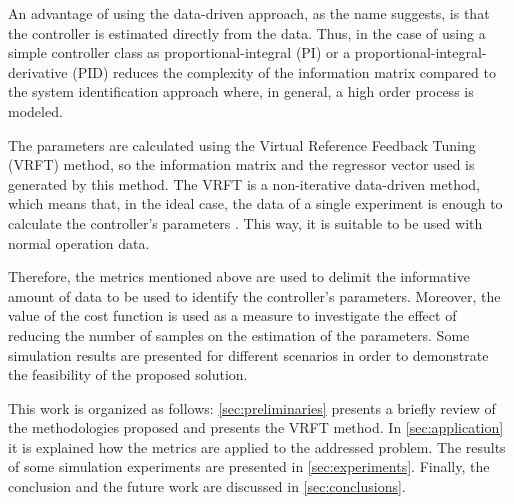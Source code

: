 \documentclass[letterpaper, 10 pt, conference]{ieeeconf}  %
\begin{document}
An advantage of using the data-driven approach, as the name suggests, is that the controller is estimated directly from the data.
Thus, in the case of using a simple controller class as proportional-integral (PI) or a proportional-integral-derivative (PID) reduces the complexity of the information matrix compared to the system identification approach where, in general, a high order process is modeled.



The parameters are calculated using the Virtual Reference Feedback Tuning (VRFT) method, so the information matrix and the regressor vector used is generated by this method.
The VRFT is a non-iterative data-driven method, which means that, in the ideal case, the data of a single experiment is enough to calculate the controller's parameters \cite{bazanella2011data}.
This way, it is suitable to be used with normal operation data.

Therefore, the metrics mentioned above are used to delimit the informative amount of data to be used to identify the controller's parameters.
Moreover, the value of the cost function is used as a measure to investigate the effect of reducing the number of samples on the estimation of the parameters.
Some simulation results are presented for different scenarios in order to demonstrate the feasibility of the proposed solution.

This work is organized as follows: \autoref{sec:preliminaries} presents a briefly review of the methodologies proposed and presents the VRFT method.
In \autoref{sec:application} it is explained how the metrics are applied to the addressed problem.
The results of some simulation experiments are presented in \autoref{sec:experiments}.
Finally, the conclusion and the future work are discussed in \autoref{sec:conclusions}.


\end{document}
